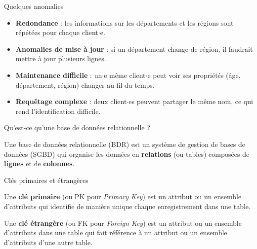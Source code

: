 \begin{frame}{Quelques anomalies}

    \begin{itemize}
        \item \textbf{Redondance} : les informations sur les départements et les
              régions sont répétées pour chaque client$\cdot$e.
        \item \textbf{Anomalies de mise à jour} : si un département change de
              région, il faudrait mettre à jour plusieurs lignes.
        \item \textbf{Maintenance difficile} : un$\cdot$e même client$\cdot$e
              peut voir ses propriétés (âge, département, région) changer au fil
              du temps.
        \item \textbf{Requêtage complexe} : deux client$\cdot$es peuvent
              partager le même nom, ce qui rend l'identification difficile.
    \end{itemize}

\end{frame}

\begin{frame}{Qu'est-ce qu'une base de données relationnelle ?}

    \begin{definitionbox}
        Une base de données relationnelle (BDR) est un système de gestion de
        bases de données (SGBD) qui organise les données en \textbf{relations}
        (ou tables) composées de \textbf{lignes} et de \textbf{colonnes}.
    \end{definitionbox}

    \begin{figure}[htb]
        \centering
        
    \end{figure}

\end{frame}

\begin{frame}{Clés primaires et étrangères}

    \begin{definitionbox}
        Une \textbf{clé primaire} (ou PK pour \textit{Primary Key}) est un
        attribut ou un ensemble d'attributs qui identifie de manière unique
        chaque enregistrement dans une table.
    \end{definitionbox}

    \pause

    \begin{definitionbox}
        Une \textbf{clé étrangère} (ou FK pour \textit{Foreign Key}) est un
        attribut ou un ensemble d'attributs dans une table qui fait référence à
        un attribut ou un ensemble d'attributs d'une autre table.
    \end{definitionbox}

\end{frame}

